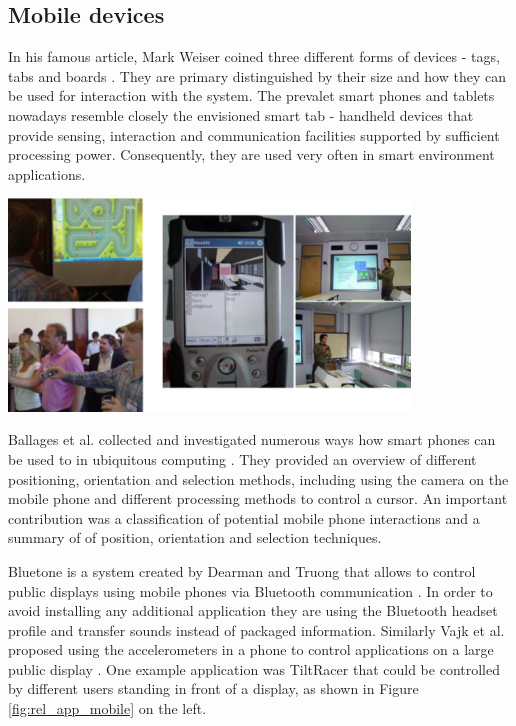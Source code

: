 \subsection{Mobile devices}
In his famous article, Mark Weiser coined three different forms of devices - tags, tabs and boards \cite{Weiser1991}. They are primary distinguished by their size and how they can be used for interaction with the system. The prevalet smart phones and tablets nowadays resemble closely the envisioned smart tab - handheld devices that provide sensing, interaction and communication facilities supported by sufficient processing power. Consequently, they are used very often in smart environment applications.

\begin{minipage}{\linewidth}
\centering
\includegraphics[width=0.8\textwidth]{images/rel_app_mobile}
\label{fig:rel_app_mobile}
\end{minipage}

Ballages et al. collected and investigated numerous ways how smart phones can be used to in ubiquitous computing \cite{ballagas2006smart}. They provided an overview of different positioning, orientation and selection methods, including using the camera on the mobile phone and different processing methods to control a cursor. An important contribution was a classification of potential mobile phone interactions and a summary of of position, orientation and selection techniques.

Bluetone is a system created by Dearman and Truong that allows to control public displays using mobile phones via Bluetooth communication \cite{dearman2009bluetone}. In order to avoid installing any additional application they are using the Bluetooth headset profile and transfer sounds instead of packaged information. Similarly Vajk et al. proposed using the accelerometers in a phone to control applications on a large public display \cite{vajk2007using}. One example application was TiltRacer that could be controlled by different users standing in front of a display, as shown in Figure \ref{fig:rel_app_mobile} on the left.

